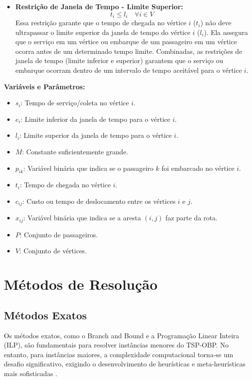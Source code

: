 \documentclass[12pt, a4paper]{report}
\begin{document}
\begin{itemize}
    \item \textbf{Restrição de Janela de Tempo - Limite Superior:}
     \begin{equation}
        t_i \leq l_i \quad \forall i \in V
    \end{equation}
    Essa restrição garante que o tempo de chegada no vértice $i$ ($t_i$) não deve ultrapassar o limite superior da janela de tempo do vértice $i$ ($l_i$). Ela assegura que o serviço em um vértice ou embarque de um passageiro em um vértice ocorra antes de um determinado tempo limite. Combinadas, as restrições de janela de tempo (limite inferior e superior) garantem que o serviço ou embarque ocorram dentro de um intervalo de tempo aceitável para o vértice $i$.
\end{itemize}

\textbf{Variáveis e Parâmetros:}

\begin{itemize}
    \item  $s_i$: Tempo de serviço/coleta no vértice $i$.
    \item $e_i$: Limite inferior da janela de tempo para o vértice $i$.
    \item  $l_i$: Limite superior da janela de tempo para o vértice $i$.
    \item  $M$: Constante suficientemente grande.
     \item $p_{ik}$: Variável binária que indica se o passageiro $k$ foi embarcado no vértice $i$.
    \item $t_i$: Tempo de chegada no vértice $i$.
      \item $c_{ij}$: Custo ou tempo de deslocamento entre os vértices $i$ e $j$.
    \item $x_{ij}$: Variável binária que indica se a aresta $(i, j)$ faz parte da rota.
      \item $P$: Conjunto de passageiros.
    \item $V$: Conjunto de vértices.
\end{itemize}

\chapter{Métodos de Resolução}

\section{Métodos Exatos}
Os métodos exatos, como o Branch and Bound e a Programação Linear Inteira (ILP), são fundamentais para resolver instâncias menores do TSP-OBP. No entanto, para instâncias maiores, a complexidade computacional torna-se um desafio significativo, exigindo o desenvolvimento de heurísticas e meta-heurísticas mais sofisticadas \cite{lopesfilho2019, carvalho2022}.
\end{document}
